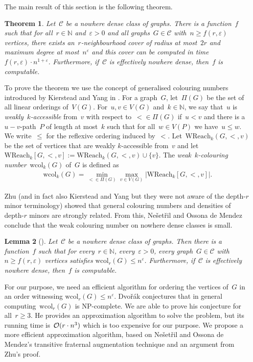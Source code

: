 \documentclass[11pt]{article}
\newtheorem{theorem}{Theorem}[section]
\newtheorem{lemma}[theorem]{Lemma}
\numberwithin{equation}{section}
\newcommand{\N}{{\mathbb N}} \newcommand{\Q}{{\mathbb Q}}
\newcommand{\CCC}{\mathcal{C}} \newcommand{\DDD}{\mathcal{D}}
\newcommand{\Oof}{\mbox{$\cal O$}}
\newcommand{\wcol}{\mathrm{wcol}}
\newcommand{\wreach}{\mathrm{WReach}}
\renewcommand{\epsilon}{\varepsilon}
\begin{document}
The main result of this section is the following theorem.

\begin{theorem}\label{thm:alg-covers}
  Let~$\CCC$ be a nowhere dense class of graphs. There is a
  function~$f$ such that for all~$r\in\N$ and~$\epsilon>0$ and all
  graphs~$G\in\CCC$ with~$n\geq f(r,\epsilon)$ vertices, there exists
  an~$r$-neighbourhood cover of radius at most~$2r$ and maximum degree
  at most~$n^\epsilon$ and this cover can be computed in
  time~$f(r,\epsilon)\cdot n^{1+\epsilon}$. Furthermore, if~$\CCC$ is
  effectively nowhere dense, then~$f$ is computable.
\end{theorem}

To prove the theorem we use the concept of generalised colouring
numbers introduced by Kierstead and Yang in \cite{KiersteadY03}.  For
a graph~$G$, let~$\Pi(G)$ be the set of all linear orderings
of~$V(G)$. 
For~$u,v\in V(G)$ and~$k\in \N$, we say that~$u$ is
\emph{weakly~$k$-accessible} from~$v$ with respect to~$<\in\Pi(G)$
if~$u< v$ and there is a~$u{-}v$-path~$P$ of length at most~$k$ such
that for all~$w\in V(P)$ we have~$u\leq w$. We write~$\leq$ for the
reflexive ordering induced by~$<$. Let~$\wreach_k(G,<, v)$ be the set
of vertices that are weakly $k$-accessible from~$v$ and let
$\wreach_k[G,<,v]:=\wreach_k(G,<,v)\cup\{v\}$. The
\emph{weak~$k$-colouring number}~$\wcol_k(G)$ of~$G$ is defined as
\begin{align*}
  \wcol_k(G)=\min_{<\in\Pi(G)}\max_{v\in V(G)}|\wreach_k[G,<,v]|.
\end{align*}

Zhu \cite{Zhu09} (and in fact also Kierstead and Yang but they were
not aware of the depth-$r$ minor terminology) showed that general
colouring numbers and densities of depth-$r$ minors are strongly
related. From this, Ne{\v s}et{\v r}il and Ossona de Mendez conclude
that the weak colouring number on nowhere dense classes is small.



\begin{lemma}[\cite{Zhu09,  NesetrilO11}]\label{thm:wcolcharacterization}
  Let~$\CCC$ be a nowhere dense class of graphs. Then there is a
  function~$f$ such that for every~$r\in\N$, every~$\epsilon>0$, every
  graph~$G\in\CCC$ with~$n\geq f(r,\epsilon)$ vertices satisfies
  $\wcol_r(G)\leq n^\epsilon$. Furthermore, if~$\CCC$ is effectively
  nowhere dense, then~$f$ is computable.
\end{lemma}

For our purpose, we need an efficient algorithm for ordering the
vertices of~$G$ in an order witnessing $\wcol_r(G)\leq
n^\epsilon$. Dvo\v r\'ak \cite{Dvorak13} conjectures that in general
computing~$\wcol_r(G)$ is NP-complete. We are able to prove his
conjecture for all~$r\geq 3$. He provides an approximation algorithm
to solve the problem, but its running time is~$\Oof(r\cdot n^3)$ which
is too expensive for our purpose.  We propose a more efficient
approximation algorithm, based on Ne{\v s}et{\v r}il and Ossona de
Mendez's transitive fraternal augmentation technique and an argument
from Zhu's proof.
\end{document}
